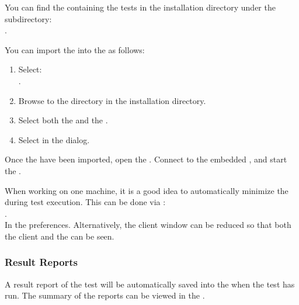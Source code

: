 You can find the \gdproject{} containing the tests
in the installation directory under the subdirectory:\\
. 

You can import the \gdproject{} into the \ite{} as follows:
\begin{enumerate}
\item Select:\\ .
\item Browse to the  directory in the installation directory. 
\item Select both the  \gdproject{} and the  \gdproject{}. 
\item  Select  in the  dialog. 
\end{enumerate}


Once the \gdprojects have been imported, open the  \gdproject{}. Connect to the embedded \gdagent {}, and start the \gdaut{} . 


When working on one machine, it is a good idea to automatically minimize 
 the \ite{} during test execution. This can be done via :\\
. \\
In the  preferences. 
Alternatively, the client window can be reduced so 
that both the client and the \gdaut{} can be seen. 

\subsubsection{Result Reports}

A result report of the test will be automatically saved into the \gddb{} when the test has run. The summary of the reports can be viewed in the \gdtestsummaryview{} .
